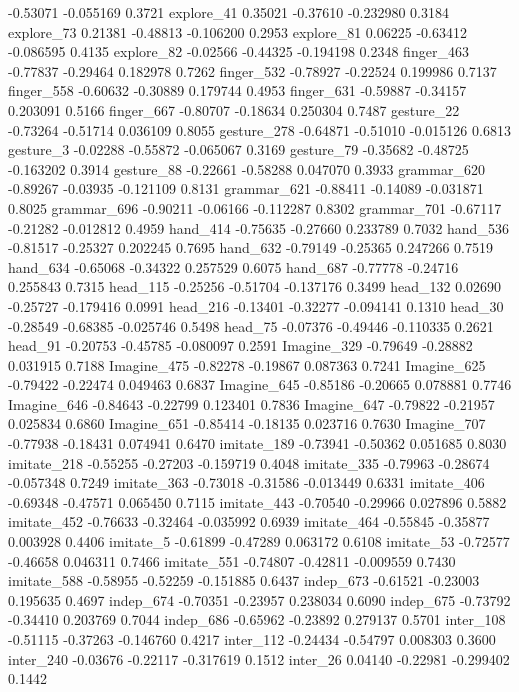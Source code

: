 \documentclass[10pt, letterpaper]{article}
\begin{document}
-0.53071 -0.055169 0.3721 explore\_41 0.35021 -0.37610 -0.232980 0.3184
explore\_73 0.21381 -0.48813 -0.106200 0.2953 explore\_81 0.06225
-0.63412 -0.086595 0.4135 explore\_82 -0.02566 -0.44325 -0.194198 0.2348
finger\_463 -0.77837 -0.29464 0.182978 0.7262 finger\_532 -0.78927
-0.22524 0.199986 0.7137 finger\_558 -0.60632 -0.30889 0.179744 0.4953
finger\_631 -0.59887 -0.34157 0.203091 0.5166 finger\_667 -0.80707
-0.18634 0.250304 0.7487 gesture\_22 -0.73264 -0.51714 0.036109 0.8055
gesture\_278 -0.64871 -0.51010 -0.015126 0.6813 gesture\_3 -0.02288
-0.55872 -0.065067 0.3169 gesture\_79 -0.35682 -0.48725 -0.163202 0.3914
gesture\_88 -0.22661 -0.58288 0.047070 0.3933 grammar\_620 -0.89267
-0.03935 -0.121109 0.8131 grammar\_621 -0.88411 -0.14089 -0.031871
0.8025 grammar\_696 -0.90211 -0.06166 -0.112287 0.8302 grammar\_701
-0.67117 -0.21282 -0.012812 0.4959 hand\_414 -0.75635 -0.27660 0.233789
0.7032 hand\_536 -0.81517 -0.25327 0.202245 0.7695 hand\_632 -0.79149
-0.25365 0.247266 0.7519 hand\_634 -0.65068 -0.34322 0.257529 0.6075
hand\_687 -0.77778 -0.24716 0.255843 0.7315 head\_115 -0.25256 -0.51704
-0.137176 0.3499 head\_132 0.02690 -0.25727 -0.179416 0.0991 head\_216
-0.13401 -0.32277 -0.094141 0.1310 head\_30 -0.28549 -0.68385 -0.025746
0.5498 head\_75 -0.07376 -0.49446 -0.110335 0.2621 head\_91 -0.20753
-0.45785 -0.080097 0.2591 Imagine\_329 -0.79649 -0.28882 0.031915 0.7188
Imagine\_475 -0.82278 -0.19867 0.087363 0.7241 Imagine\_625 -0.79422
-0.22474 0.049463 0.6837 Imagine\_645 -0.85186 -0.20665 0.078881 0.7746
Imagine\_646 -0.84643 -0.22799 0.123401 0.7836 Imagine\_647 -0.79822
-0.21957 0.025834 0.6860 Imagine\_651 -0.85414 -0.18135 0.023716 0.7630
Imagine\_707 -0.77938 -0.18431 0.074941 0.6470 imitate\_189 -0.73941
-0.50362 0.051685 0.8030 imitate\_218 -0.55255 -0.27203 -0.159719 0.4048
imitate\_335 -0.79963 -0.28674 -0.057348 0.7249 imitate\_363 -0.73018
-0.31586 -0.013449 0.6331 imitate\_406 -0.69348 -0.47571 0.065450 0.7115
imitate\_443 -0.70540 -0.29966 0.027896 0.5882 imitate\_452 -0.76633
-0.32464 -0.035992 0.6939 imitate\_464 -0.55845 -0.35877 0.003928 0.4406
imitate\_5 -0.61899 -0.47289 0.063172 0.6108 imitate\_53 -0.72577
-0.46658 0.046311 0.7466 imitate\_551 -0.74807 -0.42811 -0.009559 0.7430
imitate\_588 -0.58955 -0.52259 -0.151885 0.6437 indep\_673 -0.61521
-0.23003 0.195635 0.4697 indep\_674 -0.70351 -0.23957 0.238034 0.6090
indep\_675 -0.73792 -0.34410 0.203769 0.7044 indep\_686 -0.65962
-0.23892 0.279137 0.5701 inter\_108 -0.51115 -0.37263 -0.146760 0.4217
inter\_112 -0.24434 -0.54797 0.008303 0.3600 inter\_240 -0.03676
-0.22117 -0.317619 0.1512 inter\_26 0.04140 -0.22981 -0.299402 0.1442
\end{document}

